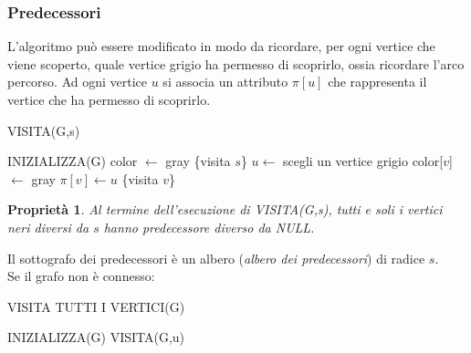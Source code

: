 \documentclass[11pt]{book}
\newtheorem*{proprietà}{Proprietà}
\begin{document}
\subsubsection{Predecessori}
L'algoritmo può essere modificato in modo da ricordare, per ogni vertice che viene scoperto, quale vertice grigio ha permesso 
di scoprirlo, ossia ricordare l'arco percorso. Ad ogni vertice $u$ si associa un attributo $\pi[u]$ che rappresenta il 
vertice che ha permesso di scoprirlo.
\begin{algorithm}[H]
    \caption{VISITA(G,s)}
    \begin{algorithmic}
        \State INIZIALIZZA(G)
        \State color $\gets$ gray
        \State \{visita $s$\}
        \State $u \gets$ scegli un vertice grigio
                \State color[$v$] $\gets$ gray
                \State $\pi[v] \gets u$
                \State \{visita $v$\}
            \EndIf
        \EndWhile
    \end{algorithmic}
\end{algorithm}
\begin{proprietà}
    Al termine dell'esecuzione di VISITA(G,s), tutti e soli i vertici neri diversi da $s$ hanno predecessore diverso da 
    NULL.
\end{proprietà}
Il sottografo dei predecessori è un albero (\textit{albero dei predecessori}) di radice $s$.\\
Se il grafo non è connesso:
\begin{algorithm}[H]
    \caption{VISITA TUTTI I VERTICI(G)}
    \begin{algorithmic}
        \State INIZIALIZZA(G)
            \State VISITA(G,u)
            \EndIf
        \EndFor
    \end{algorithmic}
\end{algorithm}
\end{document}
